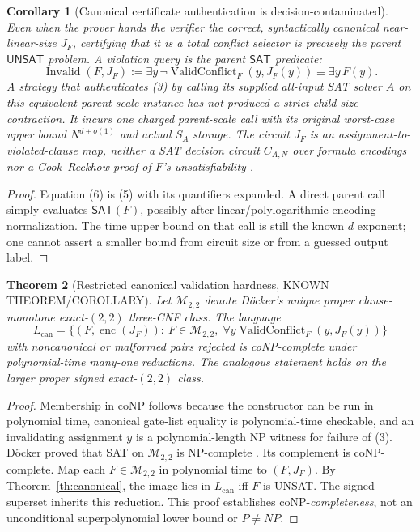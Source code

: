 \documentclass[11pt]{article}
\newtheorem{theorem}{Theorem}
\newtheorem{corollary}[theorem]{Corollary}
\newcommand{\SAT}{\mathsf{SAT}}
\newcommand{\UNSAT}{\mathsf{UNSAT}}
\begin{document}
\begin{corollary}[Canonical certificate authentication is decision-contaminated]\label{cor:contamination}
Even when the prover hands the verifier the \emph{correct}, syntactically canonical near-linear-size $J_F$, certifying that it is a total conflict selector is precisely the parent $\UNSAT$ problem. A violation query is the parent $\SAT$ predicate:
\[
\operatorname{Invalid}(F,J_F)
:=\exists y\,\neg\operatorname{ValidConflict}_F(y,J_F(y))
\equiv\exists y\,F(y).\tag{6}
\]
A strategy that authenticates (3) by calling its supplied all-input SAT solver $A$ on this equivalent parent-scale instance has not produced a strict child-size contraction. It incurs one charged parent-scale call with its original worst-case upper bound $N^{d+o(1)}$ and actual $S_A$ storage. The circuit $J_F$ is an \emph{assignment-to-violated-clause} map, neither a SAT decision circuit $C_{A,N}$ over formula encodings nor a Cook--Reckhow proof of $F$'s unsatisfiability \cite{cookreckhow1979}.
\end{corollary}
\begin{proof}
Equation (6) is (5) with its quantifiers expanded. A direct parent call simply evaluates $\SAT(F)$, possibly after linear/polylogarithmic encoding normalization. The time upper bound on that call is still the known $d$ exponent; one cannot assert a smaller bound from circuit size or from a guessed output label.\end{proof}

\begin{theorem}[Restricted canonical validation hardness, KNOWN THEOREM/COROLLARY]\label{th:hard}
Let $\mathcal M_{2,2}$ denote D\"ocker's unique proper \emph{clause-monotone} exact-$(2,2)$ three-CNF class. The language
\[
L_{\mathrm{can}}=\{(F,\operatorname{enc}(J_F)):\ F\in\mathcal M_{2,2},\;
 \forall y\operatorname{ValidConflict}_F(y,J_F(y))\}
\tag{7}
\]
with noncanonical or malformed pairs rejected is coNP-complete under polynomial-time many-one reductions. The analogous statement holds on the larger proper signed exact-$(2,2)$ class.
\end{theorem}
\begin{proof}
Membership in coNP follows because the constructor can be run in polynomial time, canonical gate-list equality is polynomial-time checkable, and an invalidating assignment $y$ is a polynomial-length NP witness for failure of (3). D\"ocker proved that SAT on $\mathcal M_{2,2}$ is NP-complete \cite{doecker2019}. Its complement is coNP-complete. Map each $F\in\mathcal M_{2,2}$ in polynomial time to $(F,J_F)$. By Theorem~\ref{th:canonical}, the image lies in $L_{\mathrm{can}}$ iff $F$ is UNSAT. The signed superset inherits this reduction. This proof establishes coNP-\emph{completeness}, not an unconditional superpolynomial lower bound or $P\ne NP$.\end{proof}
\end{document}
